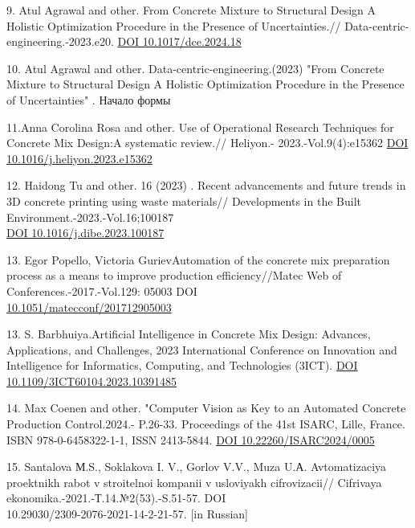 \begin{references}
9. Atul Agrawal and other. From Concrete Mixture to Structural
Design A Holistic Optimization Procedure in the Presence of
Uncertainties.// Data-centric-engineering.-2023.e20.
\href{https://doi.org/10.1017/dce.2024.18}{DOI 10.1017/dce.2024.18}

10. Atul Agrawal and other. Data-centric-engineering.(2023) "From
Concrete Mixture to Structural Design A Holistic Optimization
Procedure in the Presence of Uncertainties" . Начало формы

11.Anna Corolina Rosa and other. Use of Operational Research Techniques
for Concrete Mix Design:A systematic review.// Heliyon.-
2023.-Vol.9(4):e15362
\href{https://doi.org/10.1016/j.heliyon.2023.e15362}{DOI
10.1016/j.heliyon.2023.e15362}

12. Haidong Tu and other. 16 (2023) . Recent advancements and future
trends in 3D concrete printing using waste materials// Developments in
the Built Environment.-2023.-Vol.16;100187\\
\href{https://doi.org/10.1016/j.dibe.2023.100187}{DOI
10.1016/j.dibe.2023.100187}

13. Egor Popello, Victoria GurievAutomation of the concrete mix
preparation process as a means to improve production efficiency//Matec
Web of Conferences.-2017.-Vol.129: 05003
DOI \\\href{http://dx.doi.org/10.1051/matecconf/201712905003}{10.1051/matecconf/201712905003}

13. S. Barbhuiya.Artificial Intelligence in Concrete Mix Design:
Advances, Applications, and Challenges, 2023 International Conference on
Innovation and Intelligence for Informatics, Computing, and Technologies
(3ICT). \href{http://dx.doi.org/10.1109/3ICT60104.2023.10391485}{DOI
10.1109/3ICT60104.2023.10391485}

14. Max Coenen and other. "Computer Vision as Key to an Automated
Concrete Production Control.2024.- P.26-33. Proceedings of the 41st
ISARC, Lille, France. ISBN 978-0-6458322-1-1, ISSN 2413-5844.
\href{https://doi.org/10.22260/ISARC2024/0005}{DOI
10.22260/ISARC2024/0005}

15. Santalova М.S., Soklakova I. V., Gorlov V.V., Muza U.А.
Avtomatizaciya proektnikh rabot v stroitelnoi kompanii v usloviyakh
cifrovizacii// Cifrivaya ekonomika.-2021.-Т.14.№2(53).-S.51-57. DOI\\
10.29030/2309-2076-2021-14-2-21-57. {[}in Russian{]}
\end{references}

